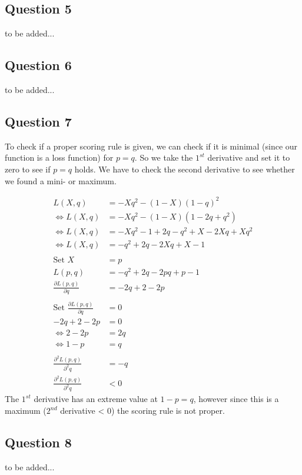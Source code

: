 \subsection*{Question 5}
to be added...



\subsection*{Question 6}
to be added...



\subsection*{Question 7}
To check if a proper scoring rule is given, we can check if it is minimal (since our function is a loss function) for $p=q$. So we take the $1^{st}$ derivative and set it to zero to see if $p=q$ holds. We have to check the second derivative to see whether we found a mini- or maximum.

\begin{align*}
                L(X,q) &= -Xq^2-(1-X)(1-q)^2 \\
\Leftrightarrow L(X,q) &= -Xq^2-(1-X)(1-2q+q^2) \\
\Leftrightarrow L(X,q) &= -Xq^2-1+2q-q^2+X-2Xq+Xq^2 \\
\Leftrightarrow L(X,q) &= -q^2+2q-2Xq+X-1 \\
\\
\text{Set }X&=p \\
L(p,q) &= -q^2+2q-2pq+p-1 \\
\frac{\partial L(p,q)}{\partial q} &= -2q+2-2p \\
\\
\text{Set }\frac{\partial L(p,q)}{\partial q}&=0 \\
-2q+2-2p &= 0\\
\Leftrightarrow 2-2p&=2q \\
\Leftrightarrow 1-p&=q \\
\\
\frac{\partial^2 L(p,q)}{\partial^2 q} &= -q \\
\frac{\partial^2 L(p,q)}{\partial^2 q} &< 0
\end{align*}
The $1^{st}$ derivative has an extreme value at $1-p=q$, however since this is a maximum ($2^{nd}$ derivative < 0) the scoring rule is not proper.



\subsection*{Question 8}
to be added...
